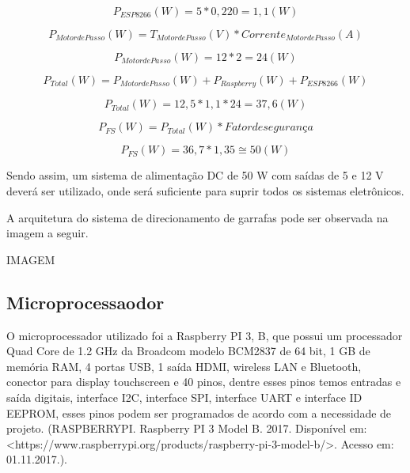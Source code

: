 \begin{equation}
    P_{ESP8266}\left ( W \right ) = 5 \ast 0,220 = 1,1 \left ( W \right )
\end{equation}

\begin{equation}
    P_{Motor de Passo}\left ( W \right ) = T_{Motor de Passo}\left (V \right ) \ast Corrente_{Motor de Passo} \left ( A \right )
\end{equation}

\begin{equation}
    P_{Motor de Passo}\left ( W \right ) = 12 \ast 2 = 24 \left ( W \right )
\end{equation}

\begin{equation}
    P_{Total}\left ( W \right ) = P_{Motor de Passo}\left (W \right ) + P_{Raspberry} \left ( W \right ) + P_{ESP8266} \left (W \right )
\end{equation}

\begin{equation}
    P_{Total}\left ( W \right ) = 12,5 * 1,1 * 24 = 37,6 \left ( W \right )
\end{equation}

\begin{equation}
    P_{FS}\left ( W \right ) = P_{Total}\left ( W \right ) * Fator de segurança
\end{equation}

\begin{equation}
    P_{FS}\left ( W \right ) = 36,7 * 1,35 \cong  50\left ( W \right )
\end{equation}

Sendo assim, um sistema de alimentação DC de 50 W com saídas de 5 e 12 V deverá ser utilizado, onde será suficiente para suprir todos os sistemas eletrônicos.

A arquitetura do sistema de direcionamento de garrafas pode ser observada na imagem a seguir.

IMAGEM

\subsection{Microprocessaodor}

O microprocessador utilizado foi a Raspberry PI 3, B, que possui um processador Quad Core de 1.2 GHz da Broadcom modelo BCM2837 de 64 bit, 1 GB de memória RAM, 4 portas USB, 1 saída HDMI, wireless LAN e Bluetooth, conector para display touchscreen e 40 pinos, dentre esses pinos temos entradas e saída digitais, interface I2C, interface SPI, interface UART e interface ID EEPROM, esses pinos podem ser programados de acordo com a necessidade de projeto. (RASPBERRYPI. Raspberry PI 3 Model B. 2017. Disponível em: <https://www.raspberrypi.org/products/raspberry-pi-3-model-b/>. Acesso em: 01.11.2017.).

